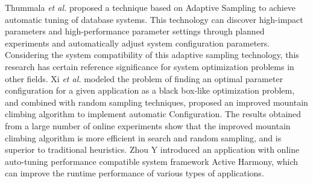 \documentclass[twoside]{article}
\begin{document}
Thummala {\it et al.} proposed a technique based on Adaptive Sampling to achieve automatic tuning of database systems\cite{wwy39,wwy40}. This technology can discover high-impact parameters and high-performance parameter settings through planned experiments and automatically adjust system configuration parameters.
Considering the system compatibility of this adaptive sampling technology, this research has certain reference significance for system optimization problems in other fields.
Xi {\it et al.} modeled the problem of finding an optimal parameter configuration for a given application as a black box-like optimization problem, and combined with random sampling techniques, proposed an improved mountain climbing algorithm to implement automatic Configuration\cite{wwy41}.
The results obtained from a large number of online experiments show that the improved mountain climbing algorithm is more efficient in search and random sampling, and is superior to traditional heuristics.
Zhou Y introduced an application with online auto-tuning performance compatible system framework Active Harmony, which can improve the runtime performance of various types of applications\cite{wwy42}.
\end{document}
